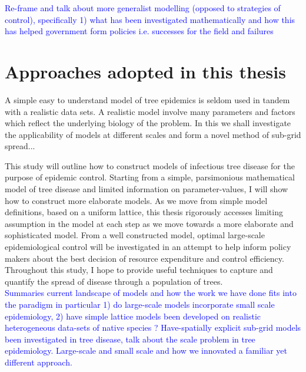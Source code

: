 \textcolor{blue}{Re-frame and talk about more generalist modelling (opposed to strategies of control), specifically 1) what has been investigated mathematically and how this has helped government form policies i.e. successes for the field and failures}

\section{Approaches adopted in this thesis}

A simple easy to understand model of tree epidemics is seldom used in tandem with a realistic data sets. A realistic model involve many parameters and factors which reflect the underlying biology of the problem. In this we shall investigate the applicability of models at different scales and form a novel method of sub-grid spread...

This study will outline how to construct models of infectious tree disease for the purpose of epidemic control. Starting from a simple, parsimonious mathematical model of tree disease and limited information on parameter-values, I will show how to construct more elaborate models. As we move from simple model definitions, based on a uniform lattice, this thesis rigorously accesses limiting assumption in the model at each step as we move towards a more elaborate and sophisticated model. From a well constructed model, optimal large-scale epidemiological control will be investigated in an attempt to help inform policy makers about the best decision of resource expenditure and control efficiency. Throughout this study, I hope to provide useful techniques to capture and quantify the spread of disease through a population of trees.\\

\textcolor{blue}{Summaries current landscape of models and how the work we have done fits into the paradigm in particular 1) do large-scale models incorporate small scale epidemiology, 2) have simple lattice models been developed on realistic heterogeneous data-sets of native species ? Have-spatially explicit sub-grid models been investigated in tree disease, talk about the scale problem in tree epidemiology. Large-scale and small scale and how we innovated a familiar yet different approach.}

